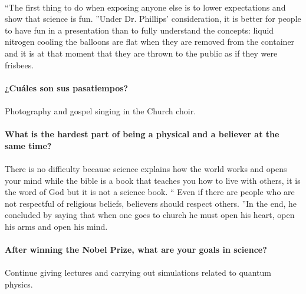 \documentclass[10pt,letterpaper]{article}
\begin{document}
\\
``The first thing to do when exposing anyone else is to lower expectations and show that science is fun. ”Under Dr. Phillips' consideration, it is better for people to have fun in a presentation than to fully understand the concepts: liquid nitrogen cooling the balloons are flat when they are removed from the container and it is at that moment that they are thrown to the public as if they were frisbees.
\\
\\
\textbf{¿Cuáles son sus pasatiempos?}
\\
\\
Photography and gospel singing in the Church choir.
\\
\\
\textbf{What is the hardest part of being a physical and a believer at the same time?}
\\
\\
There is no difficulty because science explains how the world works and opens your mind while the bible is a book that teaches you how to live with others, it is the word of God but it is not a science book. `` Even if there are people who are not respectful of religious beliefs, believers should respect others. ”In the end, he concluded by saying that when one goes to church he must open his heart, open his arms and open his mind.
\\
\\
\textbf{After winning the Nobel Prize, what are your goals in science?}
\\
\\
Continue giving lectures and carrying out simulations related to quantum physics.
\end{document}
